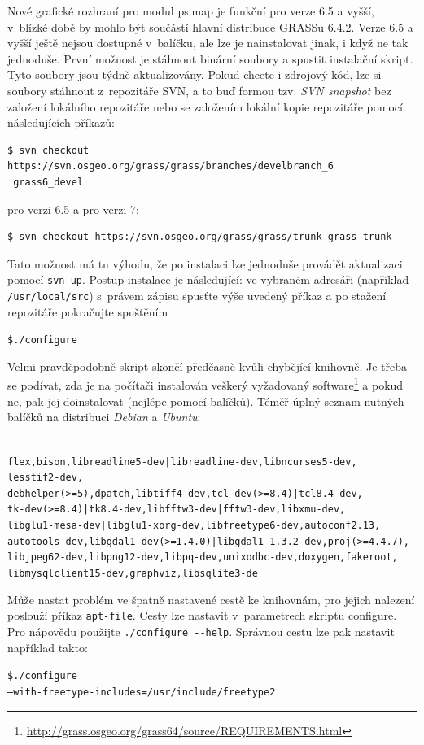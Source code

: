 \documentclass[a4paper,12pt,draft]{article}
\begin{document}
Nové grafické rozhraní pro modul ps.map je funkční pro verze 6.5
a vyšší, v~blízké době by mohlo být součástí hlavní distribuce GRASSu 6.4.2.
Verze 6.5 a vyšší ještě nejsou dostupné v~balíčku, ale lze je nainstalovat
jinak,
i když ne tak jednoduše. První možnost je stáhnout binární soubory  a
spustit instalační skript. Tyto soubory jsou týdně aktualizovány. Pokud
chcete i zdrojový kód, lze si soubory stáhnout z~repozitáře SVN, a to buď
formou tzv. \emph{SVN snapshot} bez založení lokálního repozitáře nebo
se založením lokální kopie repozitáře pomocí následujících příkazů:
\begin{footnotesize}
\begin{verbatim}
$ svn checkout https://svn.osgeo.org/grass/grass/branches/develbranch_6
 grass6_devel
\end{verbatim}
\end{footnotesize}
pro verzi 6.5 a pro verzi 7:
\begin{footnotesize}
\begin{verbatim}
$ svn checkout https://svn.osgeo.org/grass/grass/trunk grass_trunk
\end{verbatim}
\end{footnotesize}
Tato možnost má tu výhodu, že po instalaci lze jednoduše provádět
aktualizaci pomocí \verb|svn up|. Postup instalace je následující: ve
vybraném adresáři (například \verb|/usr/local/src|) s~právem zápisu
spusťte výše uvedený příkaz a po stažení repozitáře pokračujte
spuštěním
\begin{alltt}
{\footnotesize \$ ./configure}
\end{alltt}
Velmi pravděpodobně skript skončí předčasně
kvůli chybějící knihovně. Je třeba se podívat,
zda je na počítači instalován veškerý vyžadovaný
software\footnote{\url{http://grass.osgeo.org/grass64/source/REQUIREMENTS.html}}
a pokud ne, pak jej doinstalovat (nejlépe pomocí balíčků). Téměř
úplný seznam nutných balíčků na distribuci \emph{Debian} a \emph{Ubuntu}:
\begin{alltt}
{\footnotesize
flex, bison, libreadline5-dev | libreadline-dev, libncurses5-dev,
lesstif2-dev,
debhelper (>= 5), dpatch, libtiff4-dev, tcl-dev (>= 8.4) | tcl8.4-dev,
tk-dev (>= 8.4) | tk8.4-dev, libfftw3-dev|fftw3-dev, libxmu-dev,
libglu1-mesa-dev | libglu1-xorg-dev, libfreetype6-dev, autoconf2.13,
autotools-dev, libgdal1-dev (>=1.4.0) | libgdal1-1.3.2-dev, proj (>= 4.4.7),
libjpeg62-dev, libpng12-dev, libpq-dev, unixodbc-dev, doxygen, fakeroot,
libmysqlclient15-dev, graphviz, libsqlite3-de
}
\end{alltt}
Může nastat problém ve špatně nastavené cestě ke knihovnám, pro
jejich nalezení poslouží příkaz \verb|apt-file|. Cesty lze nastavit
v~parametrech skriptu configure.
Pro nápovědu použijte \verb|./configure --help|.
Správnou cestu lze pak nastavit například takto:
\begin{alltt}
{\footnotesize \$ ./configure
--with-freetype-includes=/usr/include/freetype2
}
\end{alltt}
\end{document}

